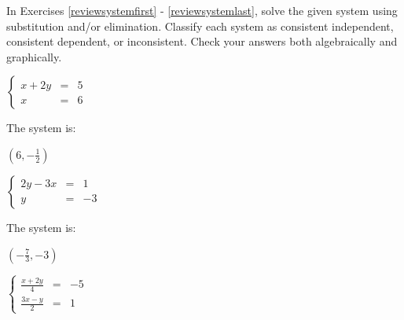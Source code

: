 \documentclass{ximera}
\begin{document}
	\author{Stitz-Zeager}



\label{ExercisesforAppLinearSystems}

\begin{question}
In Exercises \ref{reviewsystemfirst} - \ref{reviewsystemlast}, solve the given system using substitution and/or elimination. Classify each system as consistent independent, consistent dependent, or inconsistent. Check your answers both algebraically and graphically.

\begin{problem}\label{reviewsystemfirst} 
$\left\{ \begin{array}{rcr} x+2y & = & 5  \\ x  & = & 6  \end{array} \right.$  


The system is:
\begin{multipleChoice}
\end{multipleChoice}

\begin{solution}
$\left(6, -\frac{1}{2}\right)$
\end{solution}

\end{problem}

\begin{problem}
$\left\{ \begin{array}{rcr} 2y-3x & = & 1  \\ y  & = & -3 \end{array} \right.$ 


The system is:
\begin{multipleChoice}
\end{multipleChoice}

\begin{solution}
 $\left(-\frac{7}{3}, -3\right)$ 
\end{solution}
\end{problem}   

\begin{problem}
$\left\{ \begin{array}{rcr} \frac{x+2y}{4} & = & -5  \\ \frac{3x-y}{2}  & = & 1 \end{array} \right.$



\end{problem}
\end{question}
\end{document}
